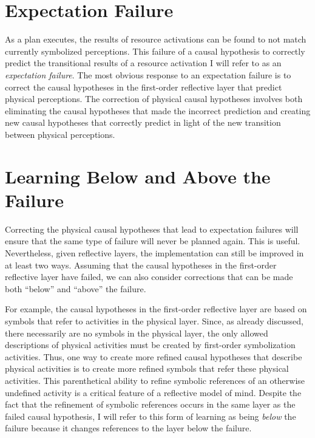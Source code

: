 \section{Expectation Failure}

As a plan executes, the results of resource activations can be found
to not match currently symbolized perceptions.  This failure of a
causal hypothesis to correctly predict the transitional results of a
resource activation I will refer to as an \emph{expectation failure}.
The most obvious response to an expectation failure is to correct the
causal hypotheses in the first-order reflective layer that predict
physical perceptions.  The correction of physical causal hypotheses
involves both eliminating the causal hypotheses that made the
incorrect prediction and creating new causal hypotheses that correctly
predict in light of the new transition between physical perceptions.

\section{Learning Below and Above the Failure}

Correcting the physical causal hypotheses that lead to expectation
failures will ensure that the same type of failure will never be
planned again.  This is useful.  Nevertheless, given reflective
layers, the implementation can still be improved in at least two ways.
Assuming that the causal hypotheses in the first-order reflective
layer have failed, we can also consider corrections that can be made
both ``below'' and ``above'' the failure.

For example, the causal hypotheses in the first-order reflective layer
are based on symbols that refer to activities in the physical layer.
Since, as already discussed, there necessarily are no symbols in the
physical layer, the only allowed descriptions of physical activities
must be created by first-order symbolization activities.  Thus, one
way to create more refined causal hypotheses that describe physical
activities is to create more refined symbols that refer these physical
activities.  This parenthetical ability to refine symbolic references
of an otherwise undefined activity is a critical feature of a
reflective model of mind.  Despite the fact that the refinement of
symbolic references occurs in the same layer as the failed causal
hypothesis, I will refer to this form of learning as being
\emph{below} the failure because it changes references to the layer
below the failure.

